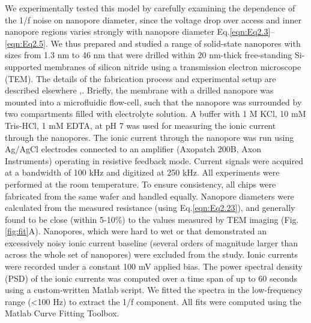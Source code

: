 We experimentally tested this model by carefully examining the dependence of the 1/f noise on nanopore diameter, since the voltage drop over access and inner nanopore regions varies strongly with nanopore diameter Eq.\ref{eqn:Eq2.3}–\ref{eqn:Eq2.5}. We thus prepared and studied a range of solid-state nanopores with sizes from 1.3 nm to 46 nm that were drilled within 20 nm-thick free-standing Si-supported membranes of silicon nitride using a transmission electron microscope (TEM). The details of the fabrication process and experimental setup are described elsewhere \cite{Janssen2012},\cite{VanDenHout2010}. Briefly, the membrane with a drilled nanopore was mounted into a microfluidic flow-cell, such that the nanopore was surrounded by two compartments filled with electrolyte solution. A buffer with 1 M KCl, 10 mM Tris-HCl, 1 mM EDTA, at pH 7 was used for measuring the ionic current through the nanopores. The ionic current through the nanopore was run using Ag/AgCl electrodes connected to an amplifier (Axopatch 200B, Axon Instruments) operating in resistive feedback mode. Current signals were acquired at a bandwidth of 100 kHz and digitized at 250 kHz. All experiments were performed at the room temperature. To ensure consistency, all chips were fabricated from the same wafer and handled equally. Nanopore diameters were calculated from the measured resistance (using Eq.\ref{eqn:Eq2.23}), and generally found to be close (within 5-10\%) to the values measured by TEM imaging (Fig. \ref{fig:fit}A). Nanopores, which were hard to wet or that demonstrated an excessively noisy ionic current baseline (several orders of magnitude larger than across the whole set of nanopores) were excluded from the study. Ionic currents were recorded under a constant 100 mV applied bias. The power spectral density (PSD) of the ionic currents was computed over a time span of up to 60 seconds using a custom-written Matlab script. We fitted the spectra in the low-frequency range (<100 Hz) to extract the 1/f component. All fits were computed using the Matlab Curve Fitting Toolbox.


